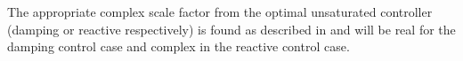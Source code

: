 The appropriate complex scale factor from the optimal unsaturated controller (damping or reactive respectively) is found as described in  and will be real for the damping control case and complex in the reactive control case.





